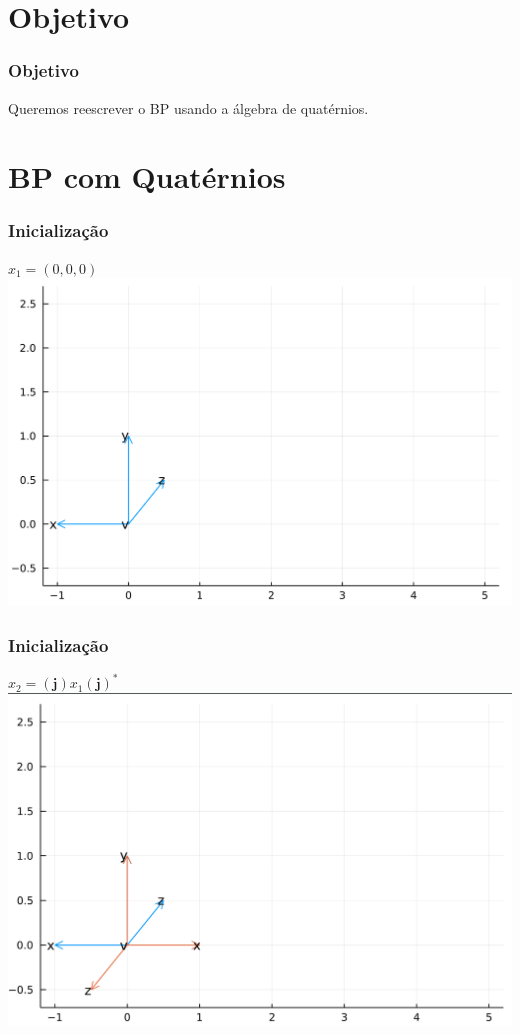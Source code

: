 \documentclass[10pt]{beamer}
\theoremstyle{plain}
\theoremstyle{definition}
\begin{document}
	\section{Objetivo}
	
	\begin{frame}
		\frametitle{\normalsize Objetivo} 
		{
			\normalsize
			
			\begin{center}
				Queremos reescrever o BP usando a álgebra de quatérnios.
			\end{center}
		}	
	\end{frame}
	
	\section{BP com Quatérnios}
	
	\begin{frame}
		\frametitle{\normalsize Inicialização \cite{thompsonBi}} 
		{
			\begin{center}
				$x_1 = (0,0,0)$
				\\
				
				\vspace{0.5cm}
				\includegraphics[width=0.8\linewidth]{1.png}
			\end{center}
		}	
	\end{frame}

	\begin{frame}
		\frametitle{\normalsize Inicialização} 
		{
			\begin{center}
				$x_2 = (\mathbf j)x_1(\mathbf j)^*$
				\\
				
				\vspace{0.5cm}
				\includegraphics[width=0.8\linewidth]{2.png}
			\end{center}
		}	
	\end{frame}
\end{document}
